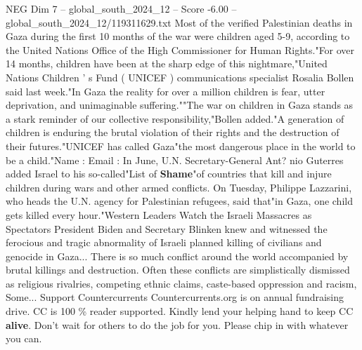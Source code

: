 \begin{textsample}{NEG Dim 7 – global\_south\_2024\_12 – Score -6.00 – global\_south\_2024\_12/119311629.txt}
Most of the verified Palestinian deaths in Gaza during the first 10 months of the war were children aged 5-9, according to the United Nations Office of the High Commissioner for Human Rights."For over 14 months, children have been at the sharp edge of this nightmare,"United Nations Children ' s Fund ( UNICEF ) communications specialist Rosalia Bollen said last week."In Gaza the reality for over a million children is fear, utter deprivation, and unimaginable suffering.""The war on children in Gaza stands as a stark reminder of our collective responsibility,"Bollen added."A generation of children is enduring the brutal violation of their rights and the destruction of their futures."UNICEF has called Gaza"the most dangerous place in the world to be a child."Name : Email : In June, U.N.
Secretary-General Ant? nio Guterres added Israel to his so-called"List of \textbf{Shame}"of countries that kill and injure children during wars and other armed conflicts.
On Tuesday, Philippe Lazzarini, who heads the U.N. agency for Palestinian refugees, said that"in Gaza, one child gets killed every hour."Western Leaders Watch the Israeli Massacres as Spectators President Biden and Secretary Blinken knew and witnessed the ferocious and tragic abnormality of Israeli planned killing of civilians and genocide in Gaza...
There is so much conflict around the world accompanied by brutal killings and destruction.
Often these conflicts are simplistically dismissed as religious rivalries, competing ethnic claims, caste-based oppression and racism, Some...
Support Countercurrents Countercurrents.org is on annual fundraising drive.
CC is 100 \% reader supported.
Kindly lend your helping hand to keep CC \textbf{alive}.
Don't wait for others to do the job for you.
Please chip in with whatever you can.

\end{textsample}
